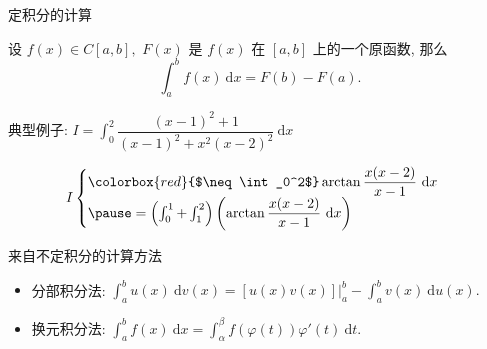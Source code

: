 \begin{frame}{定积分的计算}

\begin{thm}
设 $f(x) \in C[a, b],$ $F(x)$ 是 $f(x)$ 在 $[a, b]$ 上的一个{\color{red}原函数}, 那么
\[\int_a^b f(x) ~ \mathrm{d} x = F(b) - F(a).\]
\end{thm}

\pause

典型例子: $I = \int_0^2 \dfrac{(x-1)^2 + 1}{(x-1)^2 + x^2(x-2)^2} ~ \mathrm{d} x$

\pause

\[I \begin{cases}
\colorbox{red}{$\neq \int_0^2$} \arctan \dfrac{x(x-2)}{x-1} ~ \mathrm{d} x \\
\pause
= \left( \int_0^1 + \int_1^2 \right) \left( \arctan \dfrac{x(x-2)}{x-1} ~ \mathrm{d} x \right)
\end{cases}\]

\end{frame}


\begin{frame}{来自不定积分的计算方法}

\begin{itemize}[<+->]
\item 分部积分法: $\int_a^b u(x) ~ \mathrm{d} v(x) = \left. \left[ u(x)v(x) \right] \right|_a^b - \int_a^b v(x) ~ \mathrm{d} u(x).$
\vspace{1em}
\item 换元积分法: $\int_a^b f(x) ~ \mathrm{d} x = \int_\alpha^\beta f(\varphi(t)) \varphi'(t) ~ \mathrm{d} t.$
\end{itemize}

\end{frame}


